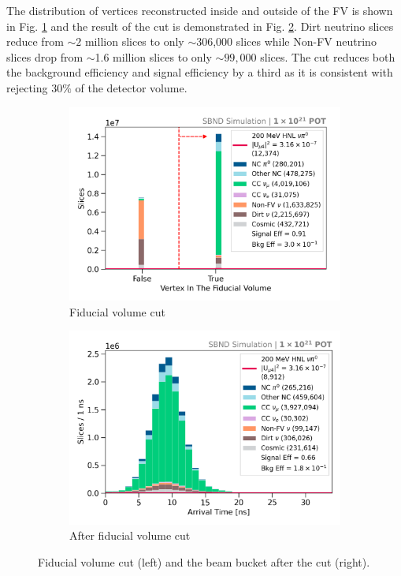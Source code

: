 The distribution of vertices reconstructed inside and outside of the FV is shown in Fig. \ref{fig:fv_cut} and the result of the cut is demonstrated in Fig. \ref{fig:bb_post_fv}.
Dirt neutrino slices reduce from $\sim2$ million slices to only $\sim$306,000 slices while Non-FV neutrino slices drop from $\sim$1.6 million slices to only $\sim99,000$ slices.
The cut reduces both the background efficiency and signal efficiency by a third as it is consistent with rejecting $30\%$ of the detector volume.

\begin{figure}[htb]
        \begin{subfigure}[b]{0.495\textwidth}   
            \centering 
            \includegraphics[width=\textwidth]{fv_precut}
            \caption{Fiducial volume cut}%
            \label{fig:fv_cut}
        \end{subfigure}
        \hfill
        \begin{subfigure}[b]{0.495\textwidth}   
            \centering 
            \includegraphics[width=\textwidth]{beam_bucket_post_fv}
            \caption{After fiducial volume cut}%
            \label{fig:bb_post_fv}
        \end{subfigure}
	\caption[Fiducial Volume Cut]{
		Fiducial volume cut (left) and the beam bucket after the cut (right). 
	}
        \label{fig:quality_fv_cut}
\end{figure}

